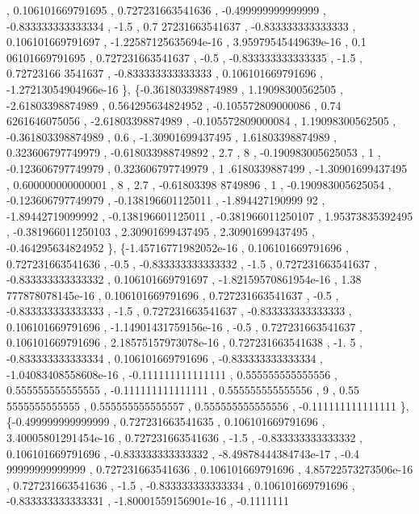 \begin{DoxyCode}
       , 0.106101669791695 , 0.727231663541636 , -0.499999999999999 , -0.833333333333334 ,              -1.5 , 0.7
      27231663541637 , -0.833333333333333 , 0.106101669791697 , -1.22587125635694e-16 , 3.95979545449639e-16 , 0.1
      06101669791695 , 0.727231663541637 ,              -0.5 , -0.833333333333335 ,              -1.5 , 0.72723166
      3541637 , -0.833333333333333 , 0.106101669791696 , -1.27213054904966e-16 \},
\{-0.361803398874989 ,  1.19098300562505 , -2.61803398874989 , 0.564295634824952 , -0.105572809000086 , 0.74
      6261646075056 , -2.61803398874989 , -0.105572809000084 ,  1.19098300562505 , -0.361803398874989 ,           
          0.6 , -1.30901699437495 ,  1.61803398874989 , 0.323606797749979 , -0.618033988749892 ,               2.7
       ,                 8 , -0.190983005625053 ,                 1 , -0.123606797749979 , 0.323606797749979 ,   1
      .6180339887499 , -1.30901699437495 , 0.600000000000001 ,                 8 ,               2.7 , -0.61803398
      8749896 ,                 1 , -0.190983005625054 , -0.123606797749979 , -0.138196601125011 , -1.894427190999
      92 , -1.89442719099992 , -0.138196601125011 , -0.381966011250107 ,  1.95373835392495 , -0.381966011250103 , 
       2.30901699437495 ,  2.30901699437495 , -0.464295634824952 \},
\{-1.45716771982052e-16 , 0.106101669791696 , 0.727231663541636 ,              -0.5 , -0.833333333333332 ,  
                  -1.5 , 0.727231663541637 , -0.833333333333332 , 0.106101669791697 , -1.82159570861954e-16 , 1.38
      777878078145e-16 , 0.106101669791696 , 0.727231663541637 ,              -0.5 , -0.833333333333333 ,         
           -1.5 , 0.727231663541637 , -0.833333333333333 , 0.106101669791696 , -1.14901431759156e-16 ,            
        -0.5 , 0.727231663541637 , 0.106101669791696 , 2.18575157973078e-16 , 0.727231663541638 ,              -1.
      5 , -0.833333333333334 , 0.106101669791696 , -0.833333333333334 , -1.04083408558608e-16 , -0.111111111111111
       , 0.555555555555556 , 0.555555555555555 , -0.111111111111111 , 0.555555555555556 ,                 9 , 0.55
      5555555555555 , 0.555555555555557 , 0.555555555555556 , -0.111111111111111 \},
\{-0.499999999999999 , 0.727231663541635 , 0.106101669791696 , 3.40005801291454e-16 , 0.727231663541636 ,   
                 -1.5 , -0.833333333333332 , 0.106101669791696 , -0.833333333333332 , -8.49878444384743e-17 , -0.4
      99999999999999 , 0.727231663541636 , 0.106101669791696 , 4.85722573273506e-16 , 0.727231663541636 ,         
           -1.5 , -0.833333333333334 , 0.106101669791696 , -0.833333333333331 , -1.80001559156901e-16 , -0.1111111

\end{DoxyCode}

